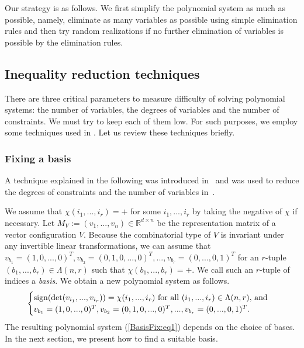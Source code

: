 \documentclass{article}
\begin{document}
Our strategy is as follows.
We  first simplify the polynomial system as much as possible, namely,
eliminate as many variables as possible using simple elimination rules
and then try random realizations if no further elimination of variables
is possible by the elimination rules.

\subsection{Inequality reduction techniques}
There are three critical parameters to measure difficulty of solving polynomial systems:
the number of variables, the degrees of variables and the number of constraints.
We must try to keep each of them low. For such purposes, we employ
some techniques used in \cite{BRS90,BS86, N07,NMF07}.
Let us review these techniques briefly.

\subsubsection{Fixing a  basis} \label{BasisFix}
A technique explained in the following was introduced in~\cite{BS86} 
and was used to reduce the degrees of constraints and the number of variables in~\cite{BS86,N07,NMF07}.

We assume that $\chi (i_1,...,i_r)=+$ for some $i_1,...,i_r$ by taking the negative of $\chi$ if necessary.
Let $M_V:=(v_1,...,v_n) \in \mathbb{R}^{d \times n}$ be the representation matrix of a vector configuration $V$.
Because the combinatorial type of $V$ is invariant under any invertible linear transformations, we can assume that
$v_{b_{1}}=(1,0,...,0)^{T},v_{b_{2}}=(0,1,0,...,0)^{T},...,v_{b_{r}}=(0,...,0,1)^{T}$ for an $r$-tuple $(b_1,...,b_r) \in \Lambda (n,r)$
such that $\chi (b_1,...,b_r) = +$.
We call such an $r$-tuple of indices a {\it basis}.
We obtain a new polynomial system as follows.
\begin{equation} \label{BasisFix:eq1}
\begin{cases}
{\rm sign}(\det(v_{i_{1}},...,v_{i_{r}})) = \chi (i_{1},...,i_{r}) \text{ for all $(i_{1},...,i_{r}) \in \Lambda(n,r),$ and} \\
v_{b_{1}}=(1,0,...,0)^{T},v_{b_{2}}=(0,1,0,...,0)^{T},...,v_{b_{r}}=(0,...,0,1)^{T}.
\end{cases}
\end{equation}
The resulting polynomial system (\ref{BasisFix:eq1}) depends on the choice of bases.
In the next section, we present how to find a suitable basis.
\end{document}
